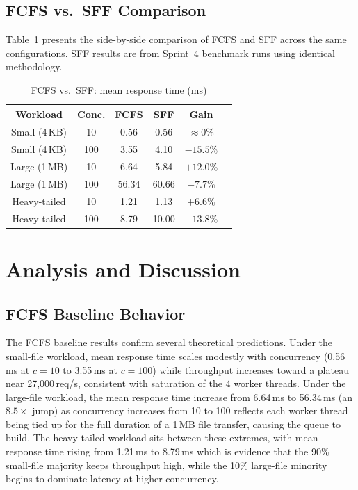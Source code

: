 \documentclass[conference]{IEEEtran}
\begin{document}
\subsection{FCFS vs.\ SFF Comparison}

Table~\ref{tab:comparison} presents the side-by-side comparison of FCFS and
SFF across the same configurations. SFF results are from Sprint~4 benchmark
runs using identical methodology.

\begin{table}[h]
\centering
\caption{FCFS vs.\ SFF: mean response time (ms)}
\label{tab:comparison}
\begin{tabular}{@{}cccccc@{}}
\toprule
\textbf{Workload} & \textbf{Conc.} & \textbf{FCFS} & \textbf{SFF} & \textbf{Gain} \\
\midrule
Small (4\,KB)  &  10 & 0.56  & 0.56  & $\approx$0\%  \\
Small (4\,KB)  & 100 & 3.55  & 4.10  & $-15.5\%$     \\
Large (1\,MB)  &  10 & 6.64  & 5.84  & $+12.0\%$     \\
Large (1\,MB)  & 100 & 56.34 & 60.66 & $-7.7\%$      \\
Heavy-tailed   &  10 & 1.21  & 1.13  & $+6.6\%$      \\
Heavy-tailed   & 100 & 8.79  & 10.00 & $-13.8\%$     \\
\bottomrule
\end{tabular}
\end{table}

\section{Analysis and Discussion}
\label{sec:analysis}

\subsection{FCFS Baseline Behavior}

The FCFS baseline results confirm several theoretical predictions. Under the
small-file workload, mean response time scales modestly with concurrency
(0.56\,ms at $c{=}10$ to 3.55\,ms at $c{=}100$) while throughput increases
toward a plateau near 27{,}000\,req/s, consistent with saturation of the 4
worker threads. Under the large-file workload, the mean response time increase
from 6.64\,ms to 56.34\,ms (an $8.5\times$ jump) as concurrency increases
from 10 to 100 reflects each worker thread being tied up for the full duration
of a 1\,MB file transfer, causing the queue to build. The heavy-tailed workload
sits between these extremes, with mean response time rising from 1.21\,ms to
8.79\,ms which is evidence that the 90\% small-file majority keeps throughput
high, while the 10\% large-file minority begins to dominate latency at higher
concurrency.
\end{document}

